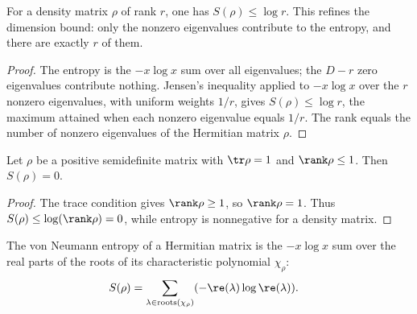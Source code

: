 \begin{theorem}\label{thm:entropy_le_log_rank}
    \leanok
    For a density matrix $\rho$ of rank $r$, one has $S(\rho)\le\log r$.
    This refines the dimension bound: only the nonzero eigenvalues contribute to
    the entropy, and there are exactly $r$ of them.
\end{theorem}

\begin{proof}\leanok
    The entropy is the $-x\log x$ sum over all eigenvalues; the $D-r$ zero
    eigenvalues contribute nothing. Jensen's inequality applied to $-x\log x$
    over the $r$ nonzero eigenvalues, with uniform weights $1/r$, gives
    $S(\rho)\le\log r$, the maximum attained when each nonzero eigenvalue
    equals $1/r$. The rank equals the number of nonzero eigenvalues of the
    Hermitian matrix $\rho$.
\end{proof}

\begin{theorem}
    \label{thm:entropy_zero_of_rank_le_one}
    \leanok
    Let $\rho$ be a positive semidefinite matrix with $\tr\rho=1$ and
    $\rank\rho\le1$. Then $S(\rho)=0$.
\end{theorem}
\begin{proof}\leanok
    The trace condition gives $\rank\rho\ge1$, so $\rank\rho=1$.
    Thus $S(\rho)\le\log(\rank\rho)=0$, while entropy is nonnegative
    for a density matrix.
\end{proof}

\begin{lemma}
    \label{lem:entropy_charpoly_roots}
    \leanok
    The von Neumann entropy of a Hermitian matrix is the $-x\log x$ sum over the
    real parts of the roots of its characteristic polynomial $\chi_\rho$:
    \begin{align}
        S(\rho)
         & =\sum_{\lambda\in\mathrm{roots}(\chi_\rho)}
        ({-}\re(\lambda)\log\re(\lambda)).
        \label{eq:entropy_charpoly}
    \end{align}
\end{lemma}

